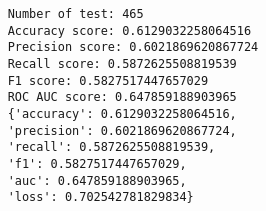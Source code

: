 \begin{lstlisting}
    Number of test: 465
    Accuracy score: 0.6129032258064516
    Precision score: 0.6021869620867724
    Recall score: 0.5872625508819539
    F1 score: 0.5827517447657029
    ROC AUC score: 0.647859188903965
    {'accuracy': 0.6129032258064516, 
    'precision': 0.6021869620867724, 
    'recall': 0.5872625508819539, 
    'f1': 0.5827517447657029, 
    'auc': 0.647859188903965, 
    'loss': 0.702542781829834}
\end{lstlisting}

